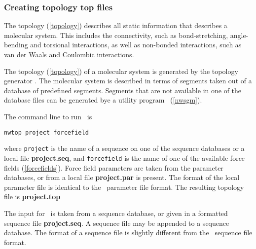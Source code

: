 \subsubsection{Creating topology {\bf top} files}
\label{nwtop}
\par
The topology (\ref{topology}) describes all static information
that describes a molecular system. This includes the connectivity, such
as bond-stretching, angle-bending and torsional interactions, as well as
non-bonded interactions, such as van der Waals and Coulombic interactions.
\par
The topology (\ref{topology}) of a molecular system is 
generated by the topology generator \nwtop. The molecular system
is described in terms of segments taken out of a database of predefined
segments. Segments that are not available in one of the database files
can be generated bye a utility program \nwsgm\ (\ref{nwsgm}).
\par
The command line to run \nwtop\ is
\begin{verbatim}
nwtop project forcefield
\end{verbatim}
where {\tt project} is the name of a sequence on one of the
sequence databases or a local file {\bf project.seq}, and
{\tt forcefield} is the name of one of the 
available force fields (\ref{forcefields}).
Force field parameters are taken from the parameter databases,
or from a local file {\bf project.par} is present. The 
format of the local parameter file is identical to the 
\argos\ parameter file format.
The resulting topology file is {\bf project.top}
\par
The input for \nwtop\ is taken from a sequence database, or
given in a formatted sequence file {\bf project.seq}. A sequence
file may be appended to a sequence database. The 
format of a sequence file is slightly different from the \argos\ 
sequence file format.
